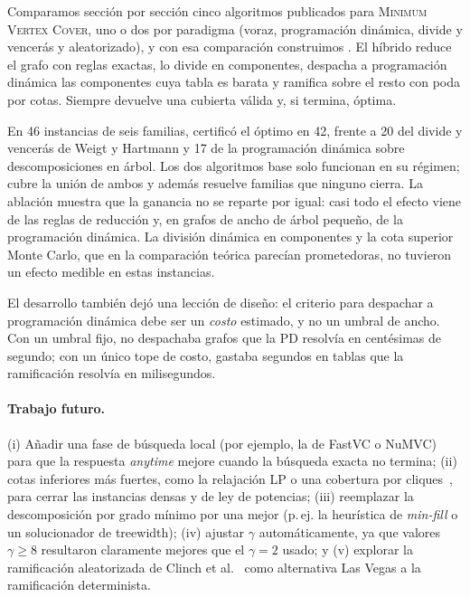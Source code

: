 Comparamos sección por sección cinco algoritmos publicados para \textsc{Minimum Vertex Cover}, uno o dos por paradigma (voraz, programación dinámica, divide y vencerás y aleatorizado), y con esa comparación construimos \hyvc. El híbrido reduce el grafo con reglas exactas, lo divide en componentes, despacha a programación dinámica las componentes cuya tabla es barata y ramifica sobre el resto con poda por cotas. Siempre devuelve una cubierta válida y, si termina, óptima.

En 46 instancias de seis familias, \hyvc{} certificó el óptimo en 42, frente a 20 del divide y vencerás de Weigt y Hartmann y 17 de la programación dinámica sobre descomposiciones en árbol. Los dos algoritmos base solo funcionan en su régimen; \hyvc{} cubre la unión de ambos y además resuelve familias que ninguno cierra. La ablación muestra que la ganancia no se reparte por igual: casi todo el efecto viene de las reglas de reducción y, en grafos de ancho de árbol pequeño, de la programación dinámica. La división dinámica en componentes y la cota superior Monte Carlo, que en la comparación teórica parecían prometedoras, no tuvieron un efecto medible en estas instancias.

El desarrollo también dejó una lección de diseño: el criterio para despachar a programación dinámica debe ser un \emph{costo} estimado, y no un umbral de ancho. Con un umbral fijo, \hyvc{} no despachaba grafos que la PD resolvía en centésimas de segundo; con un único tope de costo, gastaba segundos en tablas que la ramificación resolvía en milisegundos.

\paragraph{Trabajo futuro.} (i) Añadir una fase de búsqueda local (por ejemplo, la de FastVC o NuMVC) para que la respuesta \emph{anytime} mejore cuando la búsqueda exacta no termina; (ii) cotas inferiores más fuertes, como la relajación LP o una cobertura por cliques~\citep{akiba2016branch}, para cerrar las instancias densas y de ley de potencias; (iii) reemplazar la descomposición por grado mínimo por una mejor (p.\,ej. la heurística de \emph{min-fill} o un solucionador de treewidth); (iv) ajustar $\gamma$ automáticamente, ya que valores $\gamma\ge 8$ resultaron claramente mejores que el $\gamma=2$ usado; y (v) explorar la ramificación aleatorizada de Clinch et al.~\citep{clinch2025faster} como alternativa Las Vegas a la ramificación determinista.

